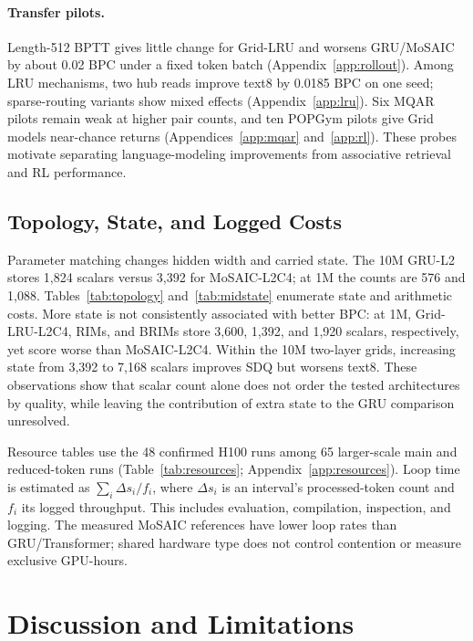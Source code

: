 \documentclass[letterpaper,twoside]{article}
\begin{document}
\paragraph{Transfer pilots.}
Length-512 BPTT gives little change for Grid-LRU and worsens GRU/MoSAIC by about 0.02 BPC under a fixed token batch (Appendix~\ref{app:rollout}). Among LRU mechanisms, two hub reads improve text8 by 0.0185 BPC on one seed; sparse-routing variants show mixed effects (Appendix~\ref{app:lru}). Six MQAR pilots remain weak at higher pair counts, and ten POPGym pilots give Grid models near-chance returns (Appendices~\ref{app:mqar} and~\ref{app:rl}). These probes motivate separating language-modeling improvements from associative retrieval and RL performance.



\subsection{Topology, State, and Logged Costs}\label{sec:resources}

Parameter matching changes hidden width and carried state. The 10M GRU-L2 stores 1,824 scalars versus 3,392 for MoSAIC-L2C4; at 1M the counts are 576 and 1,088. Tables~\ref{tab:topology} and~\ref{tab:midstate} enumerate state and arithmetic costs. More state is not consistently associated with better BPC: at 1M, Grid-LRU-L2C4, RIMs, and BRIMs store 3,600, 1,392, and 1,920 scalars, respectively, yet score worse than MoSAIC-L2C4. Within the 10M two-layer grids, increasing state from 3,392 to 7,168 scalars improves SDQ but worsens text8. These observations show that scalar count alone does not order the tested architectures by quality, while leaving the contribution of extra state to the GRU comparison unresolved.

Resource tables use the 48 confirmed H100 runs among 65 larger-scale main and reduced-token runs (Table~\ref{tab:resources}; Appendix~\ref{app:resources}). Loop time is estimated as $\sum_i\Delta s_i/f_i$, where $\Delta s_i$ is an interval's processed-token count and $f_i$ its logged throughput. This includes evaluation, compilation, inspection, and logging. The measured MoSAIC references have lower loop rates than GRU/Transformer; shared hardware type does not control contention or measure exclusive GPU-hours.

\section{Discussion and Limitations}\label{sec:limitations}
\end{document}
